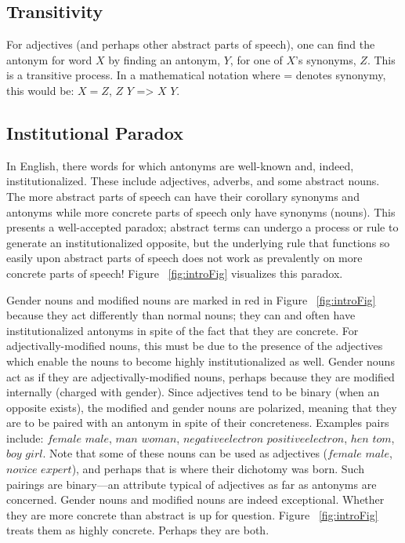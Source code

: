 \subsection {Transitivity} For adjectives (and perhaps other abstract parts of speech), one can find the antonym for word $X$ by finding an antonym, $Y$, for one of $X$’s synonyms, $Z$.  This is a transitive process.  In a mathematical notation where = denotes synonymy, this would be: $X = Z$, $Z$ \opp $Y$ => $X$ \opp $Y$.

\subsection {Institutional Paradox} In English, there words for which antonyms are well-known and, indeed, institutionalized.  These include adjectives, adverbs, and some abstract nouns.  The more abstract parts of speech can have their corollary synonyms and antonyms while more concrete parts of speech only have synonyms (nouns). This presents a well-accepted paradox; abstract terms can undergo a process or rule to generate an institutionalized opposite, but the underlying rule that functions so easily upon abstract parts of speech does not work as prevalently on more concrete parts of speech!  Figure ~\ref{fig:introFig} visualizes this paradox.

Gender nouns and modified nouns are marked in red in Figure ~\ref{fig:introFig} because they act differently than normal nouns; they can and often have institutionalized antonyms in spite of the fact that they are concrete.  For adjectivally-modified nouns, this must be due to the presence of the adjectives which enable the nouns to become highly institutionalized as well.  Gender nouns act as if they are adjectivally-modified nouns, perhaps because they are modified internally (charged with gender).  Since adjectives tend to be binary (when an opposite exists), the modified and gender nouns are polarized, meaning that they are to be paired with an antonym in spite of their concreteness.  Examples pairs include: $female$ \opp $male$, $man$ \opp $woman$, $negative electron$ \opp $positive electron$, $hen$ \opp $tom$, $boy$ \opp $girl$.  Note that some of these nouns can be used as adjectives ($female$ \opp $male$, $novice$ \opp $expert$), and perhaps that is where their dichotomy was born.  Such pairings are binary---an attribute typical of adjectives as far as antonyms are concerned.  Gender nouns and modified nouns are indeed exceptional.  Whether they are more concrete than abstract is up for question.  Figure ~\ref{fig:introFig} treats them as highly concrete.  Perhaps they are both.    

